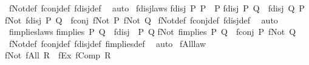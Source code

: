 \begin{isabellebody}
%
\isadelimproof
%
\endisadelimproof
%
\isatagproof
{}\isamarkupfalse%
\ fNot{\isacharunderscore}{\kern0pt}def\ fconj{\isacharunderscore}{\kern0pt}def\ fdisj{\isacharunderscore}{\kern0pt}def\ \isamarkupfalse%
\ auto%
\endisatagproof
{\isafoldproof}%
%
\isadelimproof
\isanewline
%
\endisadelimproof
\isanewline
{}\isamarkupfalse%
\ fdisj{\isacharunderscore}{\kern0pt}laws{\isacharcolon}{\kern0pt}\isanewline
{\isachardoublequoteopen}fdisj\ P\ P\ {\isasymlongleftrightarrow}\ P{\isachardoublequoteclose}\isanewline
{\isachardoublequoteopen}fdisj\ P\ Q\ {\isasymlongleftrightarrow}\ fdisj\ Q\ P{\isachardoublequoteclose}\isanewline
{\isachardoublequoteopen}fNot\ {\isacharparenleft}{\kern0pt}fdisj\ P\ Q{\isacharparenright}{\kern0pt}\ {\isasymlongleftrightarrow}\ fconj\ {\isacharparenleft}{\kern0pt}fNot\ P{\isacharparenright}{\kern0pt}\ {\isacharparenleft}{\kern0pt}fNot\ Q{\isacharparenright}{\kern0pt}{\isachardoublequoteclose}\isanewline
%
\isadelimproof
%
\endisadelimproof
%
\isatagproof
{}\isamarkupfalse%
\ fNot{\isacharunderscore}{\kern0pt}def\ fconj{\isacharunderscore}{\kern0pt}def\ fdisj{\isacharunderscore}{\kern0pt}def\ \isamarkupfalse%
\ auto%
\endisatagproof
{\isafoldproof}%
%
\isadelimproof
\isanewline
%
\endisadelimproof
\isanewline
{}\isamarkupfalse%
\ fimplies{\isacharunderscore}{\kern0pt}laws{\isacharcolon}{\kern0pt}\isanewline
{\isachardoublequoteopen}fimplies\ P\ Q\ {\isasymlongleftrightarrow}\ fdisj\ {\isacharparenleft}{\kern0pt}{\isasymnot}\ P{\isacharparenright}{\kern0pt}\ Q{\isachardoublequoteclose}\isanewline
{\isachardoublequoteopen}fNot\ {\isacharparenleft}{\kern0pt}fimplies\ P\ Q{\isacharparenright}{\kern0pt}\ {\isasymlongleftrightarrow}\ fconj\ P\ {\isacharparenleft}{\kern0pt}fNot\ Q{\isacharparenright}{\kern0pt}{\isachardoublequoteclose}\isanewline
%
\isadelimproof
%
\endisadelimproof
%
\isatagproof
{}\isamarkupfalse%
\ fNot{\isacharunderscore}{\kern0pt}def\ fconj{\isacharunderscore}{\kern0pt}def\ fdisj{\isacharunderscore}{\kern0pt}def\ fimplies{\isacharunderscore}{\kern0pt}def\ \isamarkupfalse%
\ auto%
\endisatagproof
{\isafoldproof}%
%
\isadelimproof
\isanewline
%
\endisadelimproof
\isanewline
{}\isamarkupfalse%
\ fAll{\isacharunderscore}{\kern0pt}law{\isacharcolon}{\kern0pt}\isanewline
{\isachardoublequoteopen}fNot\ {\isacharparenleft}{\kern0pt}fAll\ R{\isacharparenright}{\kern0pt}\ {\isasymlongleftrightarrow}\ fEx\ {\isacharparenleft}{\kern0pt}fComp\ R{\isacharparenright}{\kern0pt}{\isachardoublequoteclose}\isanewline

\end{isabellebody}
